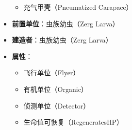 \begin{tcolorbox}[colback=white, colframe=black!60!white, title=Zerg\_Overlord(), arc=0mm]
\begin{itemize}
\begin{itemize}
                \item 充气甲壳（Pneumatized Carapace）
            \end{itemize}
        \item \textbf{前置单位}：虫族幼虫（Zerg Larva）
        \item \textbf{建造者}：虫族幼虫（Zerg Larva）
        \item \textbf{属性}：
            \begin{itemize}
                \item 飞行单位（Flyer）
                \item 有机单位（Organic）
                \item 侦测单位（Detector）
                \item 生命值可恢复（RegeneratesHP）
            \end{itemize}
    \end{itemize}
\end{tcolorbox}


